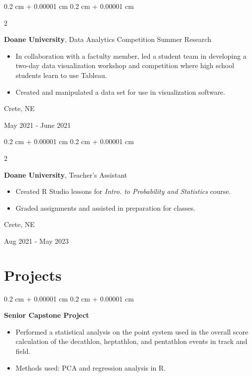 \documentclass[10pt, letterpaper]{article}
\newenvironment{highlights}{
    \begin{itemize}[
        topsep=0.10 cm,
        parsep=0.10 cm,
        partopsep=0pt,
        itemsep=0pt,
        leftmargin=0.4 cm + 10pt
    ]
}{
    \end{itemize}
} %
\newenvironment{onecolentry}{
    \begin{adjustwidth}{
        0.2 cm + 0.00001 cm
    }{
        0.2 cm + 0.00001 cm
    }
}{
    \end{adjustwidth}
} %
\newenvironment{twocolentry}[2][]{
    \onecolentry
    \def\secondColumn{#2}
    \setcolumnwidth{\fill, 4.5 cm}
    \begin{paracol}{2}
}{
    \switchcolumn \raggedleft \secondColumn
    \end{paracol}
    \endonecolentry
} %
\begin{document}
        \vspace{0.2 cm}

        \begin{twocolentry}{
            Crete, NE

        May 2021 - June 2021
        }
            \textbf{Doane University}, Data Analytics Competition Summer Research
            \begin{highlights}
                \item In collaboration with a factulty member, led a student team in developing a two-day data visualization workshop and competition where high school students learn to use Tableau.
                \item Created and manipulated a data set for use in visualization software.
            \end{highlights}
        \end{twocolentry}

         \vspace{0.2 cm}

        \begin{twocolentry}{
            Crete, NE
            
        Aug 2021 - May 2023
        }
            \textbf{Doane University}, Teacher's Assistant
            \begin{highlights}
                \item Created R Studio lessons for \textit{Intro. to Probability and Statistics} course.
                \item Graded assignments and assisted in preparation for classes.
            \end{highlights}
        \end{twocolentry}


    
    \section{Projects}

        
        \begin{onecolentry}{
            
        }
            \textbf{Senior Capstone Project}
            \begin{highlights}
                \item Performed a statistical analysis on the point system used in the overall score calculation of the decathlon, heptathlon, and pentathlon events in track and field.
                \item Methods used: PCA and regression analysis in R.
            \end{highlights}
        \end{onecolentry}
\end{document}
